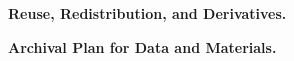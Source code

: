 \documentclass[11pt]{article}
\renewcommand{\paragraph}[1]{\smallskip\noindent\textbf{#1.}}
\begin{document}
\paragraph{Reuse, Redistribution, and Derivatives}

\paragraph{Archival Plan for Data and Materials}
\end{document}
